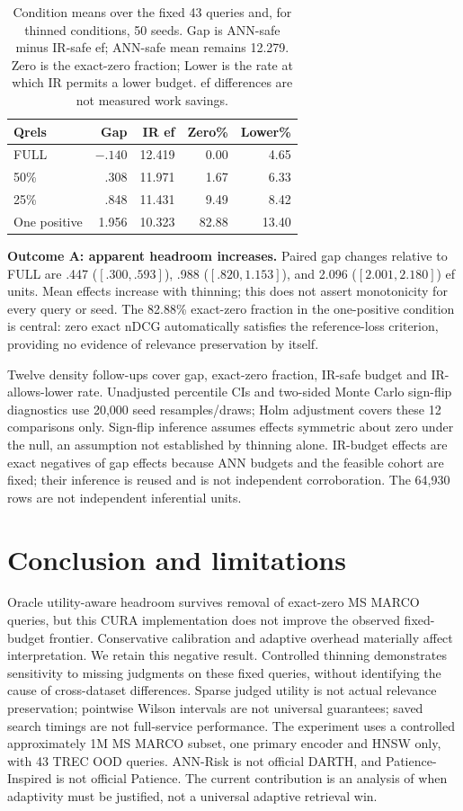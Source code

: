 \documentclass[10pt,twocolumn]{article}
\begin{document}
\begin{table}[t]
\centering\small
\begin{tabular}{lrrrr}
\toprule
Qrels & Gap & IR ef & Zero\% & Lower\%\\
\midrule
FULL & $-.140$ & 12.419 & 0.00 & 4.65\\
50\% & .308 & 11.971 & 1.67 & 6.33\\
25\% & .848 & 11.431 & 9.49 & 8.42\\
One positive & 1.956 & 10.323 & 82.88 & 13.40\\
\bottomrule
\end{tabular}
\caption{Condition means over the fixed 43 queries and, for thinned conditions, 50 seeds. Gap is ANN-safe minus IR-safe ef; ANN-safe mean remains 12.279. Zero is the exact-zero fraction; Lower is the rate at which IR permits a lower budget. ef differences are not measured work savings.}
\end{table}

\textbf{Outcome A: apparent headroom increases.} Paired gap changes relative to FULL are .447 ($[.300,.593]$), .988 ($[.820,1.153]$), and 2.096 ($[2.001,2.180]$) ef units. Mean effects increase with thinning; this does not assert monotonicity for every query or seed. The 82.88\% exact-zero fraction in the one-positive condition is central: zero exact nDCG automatically satisfies the reference-loss criterion, providing no evidence of relevance preservation by itself.

Twelve density follow-ups cover gap, exact-zero fraction, IR-safe budget and IR-allows-lower rate. Unadjusted percentile CIs and two-sided Monte Carlo sign-flip diagnostics use 20,000 seed resamples/draws; Holm adjustment covers these 12 comparisons only. Sign-flip inference assumes effects symmetric about zero under the null, an assumption not established by thinning alone. IR-budget effects are exact negatives of gap effects because ANN budgets and the feasible cohort are fixed; their inference is reused and is not independent corroboration. The 64,930 rows are not independent inferential units.

\section{Conclusion and limitations}
Oracle utility-aware headroom survives removal of exact-zero MS MARCO queries, but this CURA implementation does not improve the observed fixed-budget frontier. Conservative calibration and adaptive overhead materially affect interpretation. We retain this negative result.
Controlled thinning demonstrates sensitivity to missing judgments on these fixed queries, without identifying the cause of cross-dataset differences. Sparse judged utility is not actual relevance preservation; pointwise Wilson intervals are not universal guarantees; saved search timings are not full-service performance. The experiment uses a controlled approximately 1M MS MARCO subset, one primary encoder and HNSW only, with 43 TREC OOD queries. ANN-Risk is not official DARTH, and Patience-Inspired is not official Patience. The current contribution is an analysis of when adaptivity must be justified, not a universal adaptive retrieval win.
\end{document}
